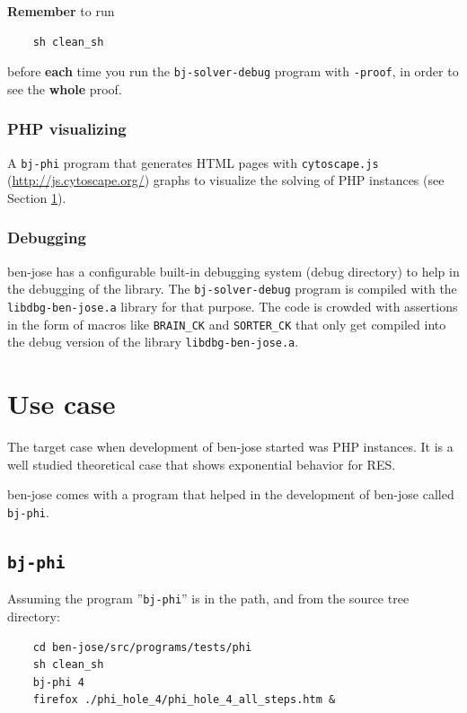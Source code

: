 \documentclass{easychair}
\newcommand{\bjphi}{\texttt{bj-phi}}
\newcommand{\bjbatchsolver}{\texttt{bj-solver-debug}}
\begin{document}
\textbf{Remember} to run

\begin{verbatim}
	sh clean_sh
\end{verbatim}

before \textbf{each} time you run the {\bjbatchsolver} program with \texttt{-proof}, in order to see the \textbf{whole} proof.

\subsubsection{PHP visualizing}

A {\bjphi} program that generates HTML pages with \texttt{cytoscape.js} (\url{http://js.cytoscape.org/}) graphs to visualize the solving of PHP instances (see Section \ref{sect:use-case}).

\subsubsection{Debugging}

ben-jose has a configurable built-in debugging system (debug directory) to help in the debugging of the library. The \texttt{bj-solver-debug} program is compiled with the \texttt{libdbg-ben-jose.a} library for that purpose. The code is crowded with assertions in the form of macros like \texttt{BRAIN\_CK} and \texttt{SORTER\_CK} that only get compiled into the debug version of the library \texttt{libdbg-ben-jose.a}.


\section{Use case}
\label{sect:use-case}

The target case when development of ben-jose started was PHP instances. It is a well studied theoretical case that shows exponential behavior for RES.

ben-jose comes with a program that helped in the development of ben-jose called {\bjphi}.

\subsection{\bjphi}

Assuming the program ''{\bjphi}'' is in the path, and from the source tree directory:

\begin{verbatim}
	cd ben-jose/src/programs/tests/phi
	sh clean_sh
	bj-phi 4
	firefox ./phi_hole_4/phi_hole_4_all_steps.htm &
\end{verbatim}
\end{document}
